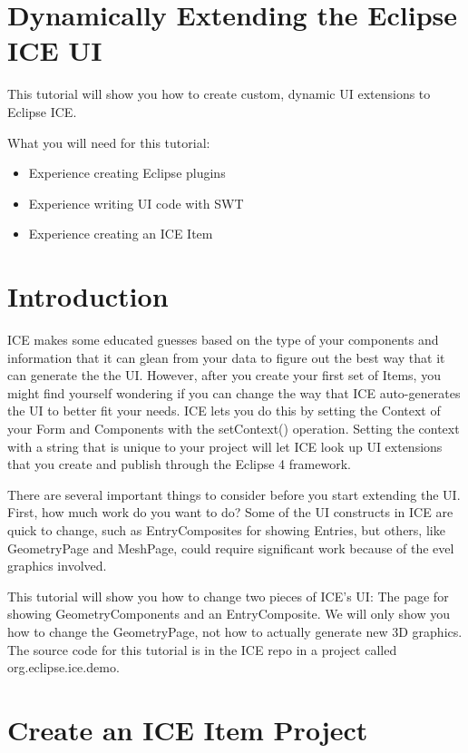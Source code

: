 \documentclass{article}
\begin{document}
\section*{Dynamically Extending the Eclipse ICE UI}

This tutorial will show you how to create custom, dynamic UI extensions to
Eclipse ICE.

What you will need for this tutorial:
\begin{itemize}
\item Experience creating Eclipse plugins
\item Experience writing UI code with SWT
\item Experience creating an ICE Item
\end{itemize}

\section{Introduction}

ICE makes some educated guesses based on the type of your components and
information that it can glean from your data to figure out the best way that it
can generate the the UI. However, after you create your first set of Items, you
might find yourself wondering if you can change the way that ICE auto-generates
the UI to better fit your needs. ICE lets you do this by setting the Context of
your Form and Components with the setContext() operation. Setting the context
with a string that is unique to your project will let ICE look up UI extensions
that you create and publish through the Eclipse 4 framework.

There are several important things to consider before you start extending the
UI. First, how much work do you want to do? Some of the UI constructs in ICE
are quick to change, such as EntryComposites for showing Entries, but others,
like GeometryPage and MeshPage, could require significant work because of the
evel graphics involved.

This tutorial will show you how to change two pieces of ICE’s UI: The page for
showing GeometryComponents and an EntryComposite. We will only show you how to
change the GeometryPage, not how to actually generate new 3D graphics. The
source code for this tutorial is in the ICE repo in a project called
org.eclipse.ice.demo.

\section{Create an ICE Item Project}
\end{document}
